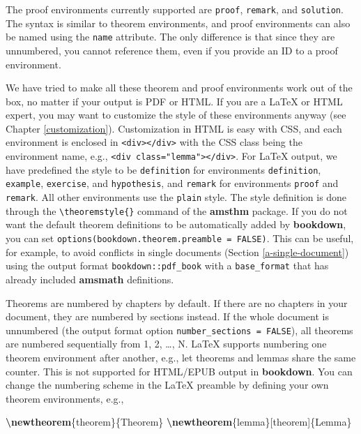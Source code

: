 \documentclass[
  12pt,
]{krantz}
\newenvironment{Shaded}{\begin{snugshade}}{\end{snugshade}}
\newcommand{\FunctionTok}[1]{\textcolor[rgb]{0.13,0.29,0.53}{\textbf{#1}}}
\newcommand{\NormalTok}[1]{#1}
\theoremstyle{definition}
\theoremstyle{definition}
\theoremstyle{definition}
\theoremstyle{definition}
\theoremstyle{remark}
\begin{document}
The proof environments currently supported are \texttt{proof}, \texttt{remark}, and \texttt{solution}. The syntax is similar to theorem environments, and proof environments can also be named using the \texttt{name} attribute. The only difference is that since they are unnumbered, you cannot reference them, even if you provide an ID to a proof environment.

We have tried to make all these theorem and proof environments work out of the box, no matter if your output is PDF or HTML. If you are a LaTeX or HTML expert, you may want to customize the style of these environments anyway (see Chapter \ref{customization}). Customization in HTML is easy with CSS, and each environment is enclosed in \texttt{\textless{}div\textgreater{}\textless{}/div\textgreater{}} with the CSS class being the environment name, e.g., \texttt{\textless{}div\ class="lemma"\textgreater{}\textless{}/div\textgreater{}}. For LaTeX output, we have predefined the style to be \texttt{definition} for environments \texttt{definition}, \texttt{example}, \texttt{exercise}, and \texttt{hypothesis}, and \texttt{remark} for environments \texttt{proof} and \texttt{remark}. All other environments use the \texttt{plain} style. The style definition is done through the \texttt{\textbackslash{}theoremstyle\{\}} command of the \textbf{amsthm} package. If you do not want the default theorem definitions to be automatically added by \textbf{bookdown}, you can set \texttt{options(bookdown.theorem.preamble\ =\ FALSE)}. This can be useful, for example, to avoid conflicts in single documents (Section \ref{a-single-document}) using the output format \texttt{bookdown::pdf\_book} with a \texttt{base\_format} that has already included \textbf{amsmath} definitions.

Theorems are numbered by chapters by default. If there are no chapters in your document, they are numbered by sections instead. If the whole document is unnumbered (the output format option \texttt{number\_sections\ =\ FALSE}), all theorems are numbered sequentially from 1, 2, \ldots, N. LaTeX supports numbering one theorem environment after another, e.g., let theorems and lemmas share the same counter. This is not supported for HTML/EPUB output in \textbf{bookdown}. You can change the numbering scheme in the LaTeX preamble by defining your own theorem environments, e.g.,

\begin{Shaded}
\begin{Highlighting}[]
\FunctionTok{\textbackslash{}newtheorem}\NormalTok{\{theorem\}\{Theorem\}}
\FunctionTok{\textbackslash{}newtheorem}\NormalTok{\{lemma\}[theorem]\{Lemma\}}
\end{Highlighting}
\end{Shaded}
\end{document}
